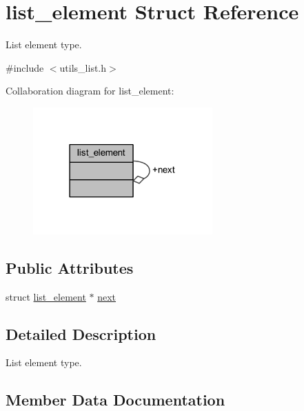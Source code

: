 \hypertarget{structlist__element}{}\section{list\+\_\+element Struct Reference}
\label{structlist__element}


List element type.  




{\ttfamily \#include $<$utils\+\_\+list.\+h$>$}



Collaboration diagram for list\+\_\+element\+:\nopagebreak
\begin{figure}[H]
\begin{center}
\leavevmode
\includegraphics[width=195pt]{structlist__element__coll__graph}
\end{center}
\end{figure}
\subsection*{Public Attributes}
\begin{DoxyCompactItemize}
\item 
struct \hyperlink{structlist__element}{list\+\_\+element} $\ast$ \hyperlink{structlist__element_a66e1becb179745b2a4070941b9a4052d}{next}
\end{DoxyCompactItemize}


\subsection{Detailed Description}
List element type. 

\subsection{Member Data Documentation}
\mbox{\label{structlist__element_a66e1becb179745b2a4070941b9a4052d}} 
